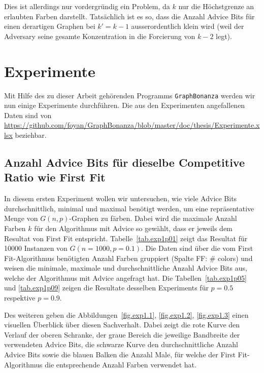 \documentclass[11pt,abstracton]{scrreprt} %
\theoremstyle{definition}
\begin{document}
\begin{itemize}
\bigskip
Dies ist allerdings nur vordergründig ein Problem, da $k$ nur die Höchstgrenze an erlaubten Farben darstellt. Tatsächlich ist es so, dass die Anzahl Advice Bits für einen derartigen Graphen bei $k' = k-1$ ausserordentlich klein wird (weil der Adversary seine gesamte Konzentration in die Forcierung von $k-2$ legt).


\end{itemize}


\section{Experimente}

Mit Hilfe des zu dieser Arbeit gehörenden Programms {\tt GraphBonanza} werden wir nun einige Experimente durchführen. Die aus den Experimenten angefallenen Daten sind von \url{https://github.com/foyan/GraphBonanza/blob/master/doc/thesis/Experimente.xlsx} beziehbar.

\subsection{Anzahl Advice Bits für dieselbe Competitive Ratio wie First Fit}

In diesem ersten Experiment wollen wir untersuchen, wie viele Advice Bits durchschnittlich, minimal und maximal benötigt werden, um eine repräsentative Menge von $G(n,p)$-Graphen zu färben. Dabei wird die maximale Anzahl Farben $k$ für den Algorithmus mit Advice so gewählt, dass er jeweils dem Resultat von First Fit entspricht. Tabelle~\ref{tab.exp1p01} zeigt das Resultat für 10000 Instanzen von $G(n = 1000, p = 0.1)$. Die Daten sind über die vom First Fit-Algorithmus benötigten Anzahl Farben gruppiert (Spalte FF: \# colors) und weisen die minimale, maximale und durchschnittliche Anzahl Advice Bits aus, welche der Algorithmus mit Advice angefragt hat. Die Tabellen~\ref{tab.exp1p05} und \ref{tab.exp1p09} zeigen die Resultate desselben Experiments für $p = 0.5$ respektive $p = 0.9$.

\bigskip
Des weiteren geben die Abbildungen~\ref{fig.exp1.1}, \ref{fig.exp1.2}, \ref{fig.exp1.3} einen visuellen Überblick über diesen Sachverhalt. Dabei zeigt die rote Kurve den Verlauf der oberen Schranke, der graue Bereich die jeweilige Bandbreite der verwendeten Advice Bits, die schwarze Kurve den durchschnittliche Anzahl Advice Bits sowie die blauen Balken die Anzahl Male, für welche der First Fit-Algorithmus die entsprechende Anzahl Farben verwendet hat.
\end{document}
